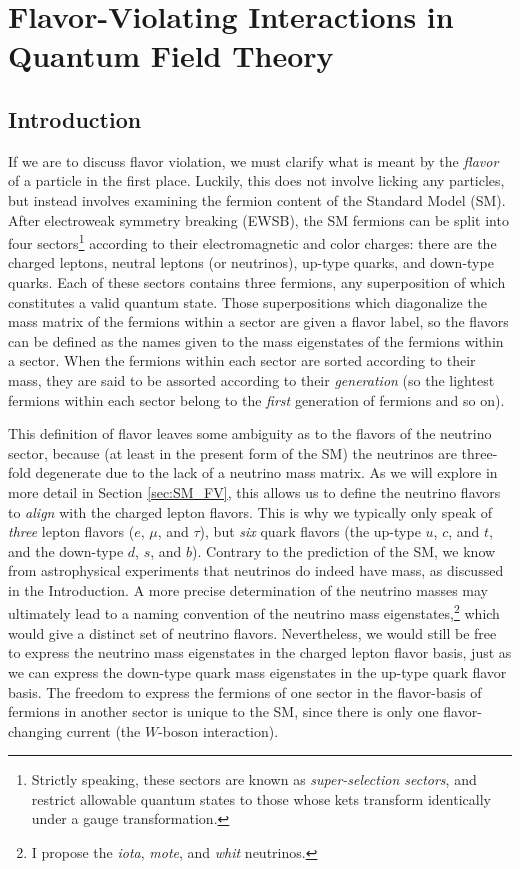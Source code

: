 \chapter{Flavor-Violating Interactions in Quantum Field Theory}
\label{fv_qft}

\section{Introduction}

If we are to discuss flavor violation, we must clarify what is meant by the {\it flavor} of a particle in the first place. Luckily, this does not involve licking any particles, but instead involves examining the fermion content of the Standard Model (SM). After electroweak symmetry breaking (EWSB), the SM fermions can be split into four sectors\footnote{Strictly speaking, these sectors are known as {\it super-selection sectors}, and restrict allowable quantum states to those whose kets transform identically under a gauge transformation.} according to their electromagnetic and color charges: there are the charged leptons, neutral leptons (or neutrinos), up-type quarks, and down-type quarks. Each of these sectors contains three fermions, any superposition of which constitutes a valid quantum state. Those superpositions which diagonalize the mass matrix of the fermions within a sector are given a   flavor label, so the flavors can be defined as the names given to the mass eigenstates of the fermions within a sector. When the fermions within each sector are sorted according to their mass, they are said to be assorted according to their {\it generation} (so the lightest fermions within each sector belong to the {\it first} generation of fermions and so on). 

This definition of flavor leaves some ambiguity as to the flavors of the neutrino sector, because (at least in the present form of the SM) the neutrinos are three-fold degenerate due to the lack of a neutrino mass matrix. As we will explore in more detail in Section \ref{sec:SM_FV}, this allows us to define the neutrino flavors to {\it align} with the charged lepton flavors. This is why we typically only speak of {\it three} lepton flavors ($e$, $\mu$, and $\tau$), but {\it six} quark flavors (the up-type $u$, $c$, and $t$, and the down-type $d$, $s$, and $b$). Contrary to the prediction of the SM, we know from astrophysical experiments that neutrinos do indeed have mass, as discussed in the Introduction. A more precise determination of the neutrino masses may ultimately lead to a naming convention of the neutrino mass eigenstates,\footnote{I propose the {\it iota}, {\it mote}, and {\it whit} neutrinos.} which would give a distinct set of neutrino flavors. Nevertheless, we would still be free to express the neutrino mass eigenstates in the charged lepton flavor basis, just as we can express the down-type quark mass eigenstates in the up-type quark flavor basis. The freedom to express the fermions of one sector in the flavor-basis of fermions in another sector is unique to the SM, since there is only one flavor-changing current (the $W$-boson interaction). 

